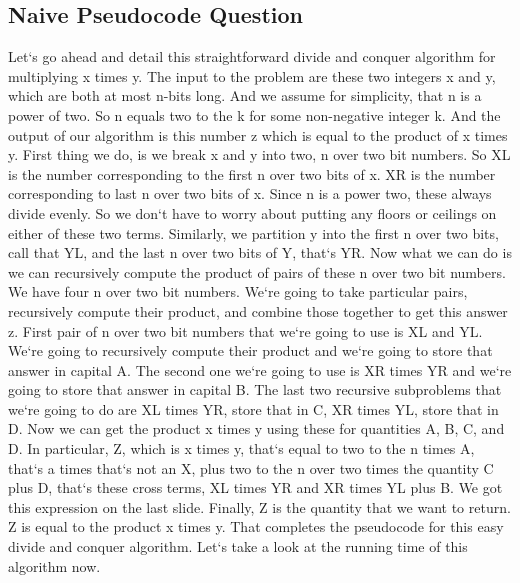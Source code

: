 \subsection{Naive  Pseudocode Question}
Let`s go ahead and detail this straightforward divide and conquer algorithm for multiplying x times y.
The input to the problem are these two integers x and y, which are both at most n-bits long.
And we assume for simplicity, that n is a power of two.
So n equals two to the k for some non-negative integer k.
And the output of our algorithm is this number z which is equal to the product of x times y.
First thing we do, is we break x and y into two, n over two bit numbers.
So XL is the number corresponding to the first n over two bits of x.
XR is the number corresponding to last n over two bits of x.
Since n is a power two, these always divide evenly.
So we don`t have to worry about putting any floors or ceilings on either of these two terms.
Similarly, we partition y into the first n over two bits, call that YL, and the last n over two bits of Y, that`s YR\@.
Now what we can do is we can recursively compute the product of pairs of these n over two bit numbers.
We have four n over two bit numbers.
We`re going to take particular pairs, recursively compute their product, and combine those together to get this answer z.
First pair of n over two bit numbers that we`re going to use is XL and YL\@.
We`re going to recursively compute their product and we`re going to store that answer in capital A\@.
The second one we`re going to use is XR times YR and we`re going to store that answer in capital B\@.
The last two recursive subproblems that we`re going to do are XL times YR, store that in C, XR times YL, store that in D\@.
Now we can get the product x times y using these for quantities A, B, C, and D\@.
In particular, Z, which is x times y, that`s equal to two to the n times A, that`s a times that`s not an X, plus two to the n over two times the quantity C plus D, that`s these cross terms, XL times YR and XR times YL plus B\@.
We got this expression on the last slide.
Finally, Z is the quantity that we want to return.
Z is equal to the product x times y.
That completes the pseudocode for this easy divide and conquer algorithm.
Let`s take a look at the running time of this algorithm now.

